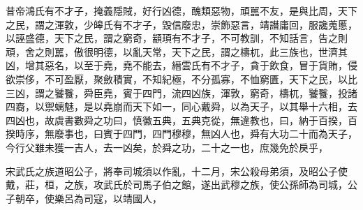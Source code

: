 \documentclass{ctexart}
\begin{document}
昔帝鴻氏有不才子，掩義隱賊，好行凶德，醜類惡物，頑嚚不友，是與比周，天下之民，謂之渾敦，少皞氏有不才子，毀信廢忠，崇飾惡言，靖譖庸回，服讒蒐慝，以誣盛德，天下之民，謂之窮奇，顓頊有不才子，不可教訓，不知話言，告之則頑，舍之則嚚，傲很明德，以亂天常，天下之民，謂之檮杌，此三族也，世濟其凶，增其惡名，以至于堯，堯不能去，縉雲氏有不才子，貪于飲食，冒于貨賄，侵欲崇侈，不可盈厭，聚斂積實，不知紀極，不分孤寡，不恤窮匱，天下之民，以比三凶，謂之饕餮，舜臣堯，賓于四門，流四凶族，渾敦，窮奇，檮杌，饕餮，投諸四裔，以禦螭魅，是以堯崩而天下如一，同心戴舜，以為天子，以其舉十六相，去四凶也，故虞書數舜之功曰，慎徽五典，五典克從，無違教也，曰，納于百揆，百揆時序，無廢事也，曰賓于四門，四門穆穆，無凶人也，舜有大功二十而為天子，今行父雖未獲一吉人，去一凶矣，於舜之功，二十之一也，庶幾免於戾乎，

宋武氏之族道昭公子，將奉司城須以作亂，十二月，宋公殺母弟須，及昭公子使戴，莊，桓，之族，攻武氏於司馬子伯之館，遂出武穆之族，使公孫師為司城，公子朝卒，使樂呂為司寇，以靖國人，
\end{document}
